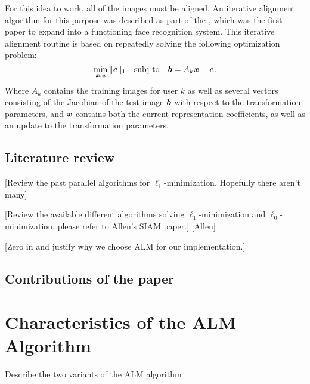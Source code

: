 \documentclass[10pt,twocolumn,letterpaper]{article}
\begin{document}
For this idea to work, all of the images must be aligned. An iterative alignment
algorithm for this purpose was described as part of the \cite{Wagner2009-CVPR}, which was
the first paper to expand \cite{Wright2009-PAMI} into a functioning face recognition system.
This iterative alignment routine is based on repeatedly solving the following optimization problem:
\begin{equation}
\min_{{\boldsymbol{x}}, \boldsymbol{e}} \|\boldsymbol{e}\|_1 \quad \textup{subj to} \quad \boldsymbol{b} = A_k {\boldsymbol{x}} + \boldsymbol{e}.
\end{equation}
Where $A_k$ contains the training images for user $k$ as well as several vectors consisting of the
Jacobian of the test image $\boldsymbol{b}$ with respect to the transformation parameters, and ${\boldsymbol{x}}$ contains
both the current representation coefficients, as well as an update to the transformation parameters.

\subsection{Literature review}
[Review the past parallel algorithms for $\ell_1$-minimization. Hopefully there aren't many]

[Review the available different algorithms solving $\ell_1$-minimization and $\ell_0$-minimization, please refer to Allen's SIAM paper.]
[Allen]

[Zero in and justify why we choose ALM for our implementation.]

\subsection{Contributions of the paper}

\section{Characteristics of the ALM Algorithm}
Describe the two variants of the ALM algorithm
\end{document}
